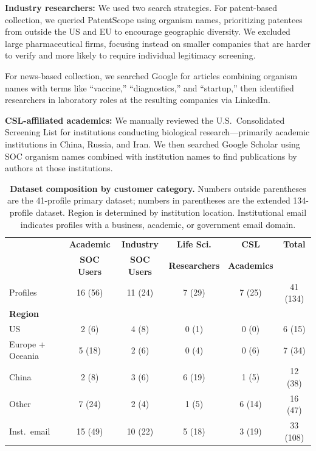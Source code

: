\documentclass[utf8]{FrontiersinHarvard}
\begin{document}
\textbf{Industry researchers:} We used two search strategies. For patent-based collection, we queried PatentScope using organism names, prioritizing patentees from outside the US and EU to encourage geographic diversity. We excluded large pharmaceutical firms, focusing instead on smaller companies that are harder to verify and more likely to require individual legitimacy screening.

For news-based collection, we searched Google for articles combining organism names with terms like ``vaccine,'' ``diagnostics,'' and ``startup,'' then identified researchers in laboratory roles at the resulting companies via LinkedIn.

\textbf{CSL-affiliated academics:} We manually reviewed the U.S.\ Consolidated Screening List for institutions conducting biological research---primarily academic institutions in China, Russia, and Iran. We then searched Google Scholar using SOC organism names combined with institution names to find publications by authors at those institutions.

\begin{table}[!t]
\centering
\caption{\textbf{Dataset composition by customer category.} Numbers outside parentheses are the 41-profile primary dataset; numbers in parentheses are the extended 134-profile dataset. Region is determined by institution location. Institutional email indicates profiles with a business, academic, or government email domain.}
\label{tab:dataset}
\begin{tabular}{lccccc}
\toprule
 & \textbf{Academic} & \textbf{Industry} & \textbf{Life Sci.} & \textbf{CSL} & \textbf{Total} \\
 & \textbf{SOC Users} & \textbf{SOC Users} & \textbf{Researchers} & \textbf{Academics} & \\
\midrule
Profiles & 16 (56) & 11 (24) & 7 (29) & 7 (25) & 41 (134) \\
\midrule
\textbf{Region} & & & & & \\
US & 2 (6) & 4 (8) & 0 (1) & 0 (0) & 6 (15) \\
Europe + Oceania & 5 (18) & 2 (6) & 0 (4) & 0 (6) & 7 (34) \\
China & 2 (8) & 3 (6) & 6 (19) & 1 (5) & 12 (38) \\
Other & 7 (24) & 2 (4) & 1 (5) & 6 (14) & 16 (47) \\
\midrule
Inst.\ email & 15 (49) & 10 (22) & 5 (18) & 3 (19) & 33 (108) \\
\bottomrule
\end{tabular}
\end{table}
\end{document}
